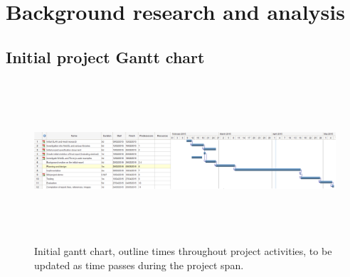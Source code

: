 \chapter{Background research and analysis}

\begin{landscape}
\section{Initial project Gantt chart}
\label{app:gantt1}
\begin{figure}[h!]
  \centering
   	\caption{Initial gantt chart, outline times throughout project activities, to be updated as time passes during the project span.}
      \includegraphics[width=23cm, height=6cm]{images/first.png}
\end{figure}
\end{landscape}
\clearpage

